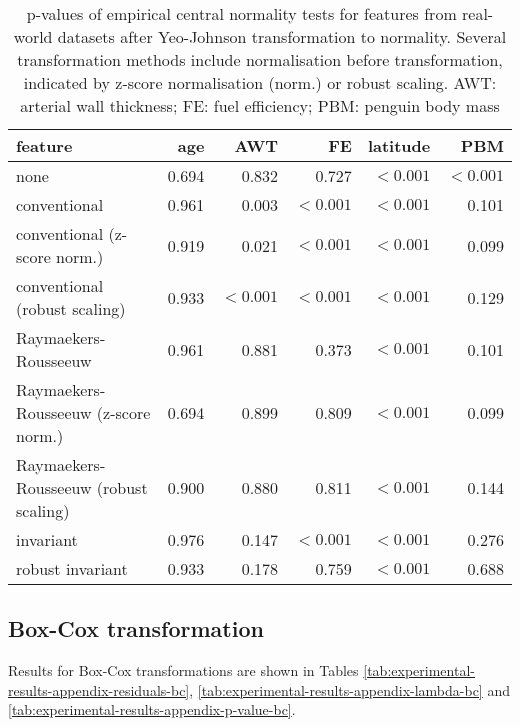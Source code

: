 \documentclass[
  a4paper,
]{article}
\begin{document}
\begin{table}
\begin{center}
\caption{
p-values of empirical central normality tests for features from real-world datasets after Yeo-Johnson transformation to normality.
Several transformation methods include normalisation before transformation, indicated by z-score normalisation (norm.) or robust scaling. 
AWT: arterial wall thickness; FE: fuel efficiency; PBM: penguin body mass}
\label{tab:experimental-results-appendix-p-value}
\begin{tabular}{l | r r r r r}

\toprule
feature & age & AWT & FE & latitude & PBM \\

\midrule

none                                  & 0.694 & 0.832     & 0.727     & $< 0.001$ & $< 0.001$ \\
conventional                          & 0.961 & 0.003     & $< 0.001$ & $< 0.001$ & 0.101 \\
conventional (z-score norm.)          & 0.919 & 0.021     & $< 0.001$ & $< 0.001$ & 0.099 \\
conventional (robust scaling)         & 0.933 & $< 0.001$ & $< 0.001$ & $< 0.001$ & 0.129 \\
Raymaekers-Rousseeuw                  & 0.961 & 0.881     & 0.373     & $< 0.001$ & 0.101 \\
Raymaekers-Rousseeuw (z-score norm.)  & 0.694 & 0.899     & 0.809     & $< 0.001$ & 0.099 \\
Raymaekers-Rousseeuw (robust scaling) & 0.900 & 0.880     & 0.811     & $< 0.001$ & 0.144 \\
invariant                             & 0.976 & 0.147     & $< 0.001$ & $< 0.001$ & 0.276 \\
robust invariant                      & 0.933 & 0.178     & 0.759     & $< 0.001$ & 0.688 \\

\bottomrule
\end{tabular}
\end{center}
\end{table}

\subsection{Box-Cox transformation}\label{box-cox-transformation}

Results for Box-Cox transformations are shown in Tables
\ref{tab:experimental-results-appendix-residuals-bc},
\ref{tab:experimental-results-appendix-lambda-bc} and
\ref{tab:experimental-results-appendix-p-value-bc}.
\end{document}
